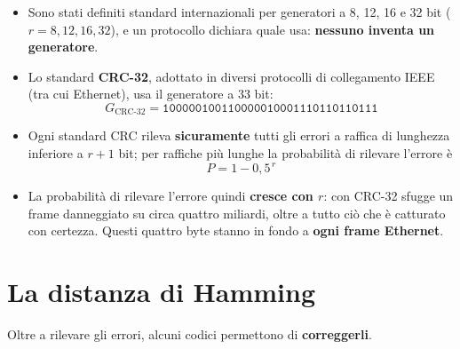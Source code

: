 \begin{itemize}
    \item Sono stati definiti standard internazionali per generatori a 8, 12, 16 e 32 bit ($r = 8, 12, 16, 32$), e un protocollo dichiara
          quale usa: \textbf{nessuno inventa un generatore}.
    \item Lo standard \textbf{CRC-32}, adottato in diversi protocolli di collegamento IEEE (tra cui Ethernet), usa il generatore a 33 bit:
          $$G_{\text{CRC-32}} = \texttt{100000100110000010001110110110111}$$
    \item Ogni standard CRC rileva \textbf{sicuramente} tutti gli errori a raffica di lunghezza inferiore a $r+1$ bit; per raffiche più
          lunghe la probabilità di rilevare l'errore è
          $$P = 1 - 0{,}5^{\,r}$$
    \item La probabilità di rilevare l'errore quindi \textbf{cresce con $r$}: con CRC-32 sfugge un frame danneggiato su circa quattro
          miliardi, oltre a tutto ciò che è catturato con certezza. Questi quattro byte stanno in fondo a \textbf{ogni frame
          Ethernet}.
\end{itemize}


\section{La distanza di Hamming}

Oltre a rilevare gli errori, alcuni codici permettono di \textbf{correggerli}.


